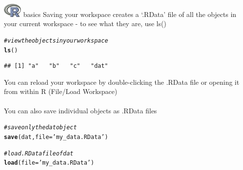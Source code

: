 \documentclass[xcolor=svgnames]{beamer}\usepackage[]{graphicx}\usepackage[]{color}
\makeatletter
\newcommand{\hlstr}[1]{\textcolor[rgb]{0.192,0.494,0.8}{#1}}%
\newcommand{\hlcom}[1]{\textcolor[rgb]{0.678,0.584,0.686}{\textit{#1}}}%
\newcommand{\hlstd}[1]{\textcolor[rgb]{0.345,0.345,0.345}{#1}}%
\newcommand{\hlkwc}[1]{\textcolor[rgb]{0.333,0.667,0.333}{#1}}%
\newcommand{\hlkwd}[1]{\textcolor[rgb]{0.737,0.353,0.396}{\textbf{#1}}}%
\newenvironment{kframe}{%
 \def\at@end@of@kframe{}%
 \ifinner\ifhmode%
  \def\at@end@of@kframe{\end{minipage}}%
  \begin{minipage}{\columnwidth}%
 \fi\fi%
 \def\FrameCommand##1{\hskip\@totalleftmargin \hskip-\fboxsep
 \colorbox{shadecolor}{##1}\hskip-\fboxsep
     \hskip-\linewidth \hskip-\@totalleftmargin \hskip\columnwidth}%
 \MakeFramed {\advance\hsize-\width
   \@totalleftmargin\z@ \linewidth\hsize
   \@setminipage}}%
 {\par\unskip\endMakeFramed%
 \at@end@of@kframe}
\newenvironment{knitrout}{}{} %
\makeatother
\begin{document}
\begin{frame}{\includegraphics[width=0.07\textwidth]{Rlogo.jpg} \hspace{0.01in} basics}
Saving your workspace creates a `.RData' file of all the objects in your current workspace - to see what they are, use ls()
\begin{knitrout}\scriptsize
{}\color{fgcolor}\begin{kframe}
\begin{alltt}
\hlcom{# view the objects in your workspace}
\hlkwd{ls}\hlstd{()}
\end{alltt}
\begin{verbatim}
## [1] "a"   "b"   "c"   "dat"
\end{verbatim}
\end{kframe}
\end{knitrout}
You can reload your workspace by double-clicking the .RData file or opening it from within R (File/Load Workspace)\\~\\
You can also save individual objects as .RData files
\begin{knitrout}\scriptsize
{}\color{fgcolor}\begin{kframe}
\begin{alltt}
\hlcom{# save only the dat object}
\hlkwd{save}\hlstd{(dat,} \hlkwc{file} \hlstd{=} \hlstr{'my_data.RData'}\hlstd{)}

\hlcom{# load .RData file of dat}
\hlkwd{load}\hlstd{(}\hlkwc{file} \hlstd{=} \hlstr{'my_data.RData'}\hlstd{)}
\end{alltt}
\end{kframe}
\end{knitrout}
\end{frame}
\end{document}

